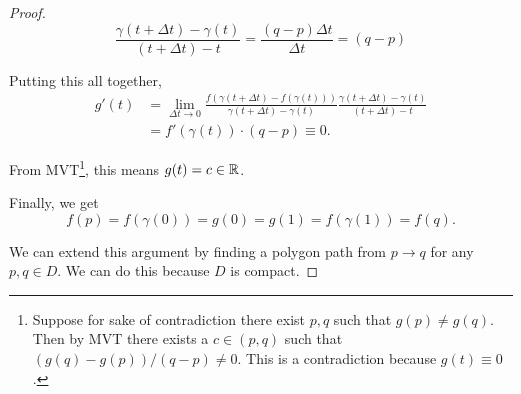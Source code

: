 \documentclass[notes]{subfile}
\begin{document}
\begin{proof}
    \[ \frac{\gamma(t + \Delta t) - \gamma(t)}{(t + \Delta t) - t}
    = \frac{(q-p)\Delta t}{\Delta t} = (q-p) \]

    Putting this all together,
    \begin{align*}
        g'(t) &= \lim_{\Delta t \to 0} \frac{f(\gamma(t+\Delta t) - f(\gamma(t)))}{\gamma(t + \Delta t) - \gamma(t)}\frac{\gamma(t + \Delta t) - \gamma(t)}{(t + \Delta t) - t} \\
        &= f'(\gamma(t))\cdot(q-p) \equiv 0.
    \end{align*}

    From MVT\footnote{Suppose for sake of contradiction there exist $p,q$ such that $g(p) \ne g(q)$.  Then by MVT there exists a $c \in (p,q)$ such that $(g(q)-g(p))/(q-p) \ne 0$.  This is a contradiction because $g(t) \equiv 0$.}, this means $g(t) = c \in \operatorname{\mathbb{R}}$.
    
    Finally, we get
    \[ f(p) = f(\gamma(0)) = g(0) = g(1) = f(\gamma(1)) = f(q). \]

    We can extend this argument by finding a polygon path from $p \to q$ for any $p,q \in D$.
    We can do this because $D$ is compact.




\end{proof}
\end{document}
